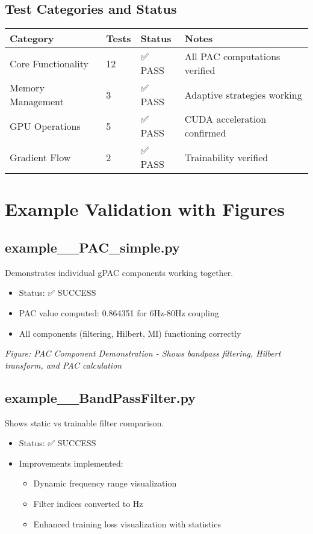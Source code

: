 \documentclass[11pt,a4paper]{article}
\begin{document}
\subsection{Test Categories and Status}

\begin{table}[H]
\centering
\begin{tabular}{llll}
\toprule
Category & Tests & Status & Notes \\
\midrule
Core Functionality & 12 & ✅ PASS & All PAC computations verified \\
Memory Management & 3 & ✅ PASS & Adaptive strategies working \\
GPU Operations & 5 & ✅ PASS & CUDA acceleration confirmed \\
Gradient Flow & 2 & ✅ PASS & Trainability verified \\
\bottomrule
\end{tabular}
\end{table}

\section{Example Validation with Figures}

\subsection{example\_\_PAC\_simple.py}
Demonstrates individual gPAC components working together.

\begin{itemize}
\item Status: ✅ SUCCESS
\item PAC value computed: 0.864351 for 6Hz-80Hz coupling
\item All components (filtering, Hilbert, MI) functioning correctly
\end{itemize}

\textit{Figure: PAC Component Demonstration - Shows bandpass filtering, Hilbert transform, and PAC calculation}

\subsection{example\_\_BandPassFilter.py}
Shows static vs trainable filter comparison.

\begin{itemize}
\item Status: ✅ SUCCESS
\item Improvements implemented:
  \begin{itemize}
  \item Dynamic frequency range visualization
  \item Filter indices converted to Hz
  \item Enhanced training loss visualization with statistics
  \end{itemize}
\end{itemize}
\end{document}
